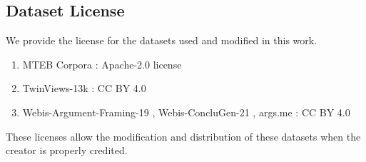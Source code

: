 \subsection{Dataset License}
\label{app:license}
We provide the license for the datasets used and modified in this work.
\begin{enumerate}
\item MTEB Corpora \citep{muennighoff2022mteb}: Apache-2.0 license\\
\item TwinViews-13k \citep{fulay2024relationship}: CC BY 4.0\\
\item Webis-Argument-Framing-19 \citep{ajjour:2019b}, Webis-ConcluGen-21 \citep{syed:2021a}, args.me \citep{ajjour:2019a}: CC BY 4.0\\
\end{enumerate}

These licenses allow the modification and distribution of these datasets when the creator is properly credited.








